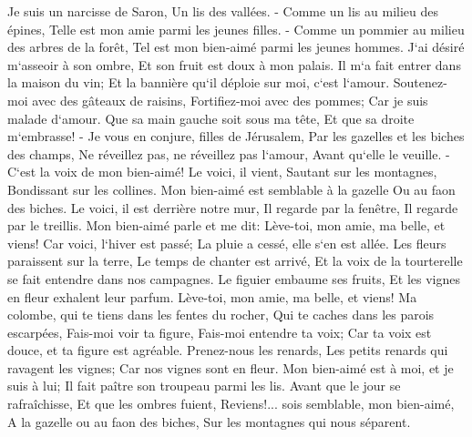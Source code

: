 \verse Je suis un narcisse de Saron, Un lis des vallées. - 
\verse Comme un lis au milieu des épines, Telle est mon amie parmi les jeunes filles. - 
\verse Comme un pommier au milieu des arbres de la forêt, Tel est mon bien-aimé parmi les jeunes hommes. J`ai désiré m`asseoir à son ombre, Et son fruit est doux à mon palais. 
\verse Il m`a fait entrer dans la maison du vin; Et la bannière qu`il déploie sur moi, c`est l`amour. 
\verse Soutenez-moi avec des gâteaux de raisins, Fortifiez-moi avec des pommes; Car je suis malade d`amour. 
\verse Que sa main gauche soit sous ma tête, Et que sa droite m`embrasse! - 
\verse Je vous en conjure, filles de Jérusalem, Par les gazelles et les biches des champs, Ne réveillez pas, ne réveillez pas l`amour, Avant qu`elle le veuille. - 
\verse C`est la voix de mon bien-aimé! Le voici, il vient, Sautant sur les montagnes, Bondissant sur les collines. 
\verse Mon bien-aimé est semblable à la gazelle Ou au faon des biches. Le voici, il est derrière notre mur, Il regarde par la fenêtre, Il regarde par le treillis. 
\verse Mon bien-aimé parle et me dit: Lève-toi, mon amie, ma belle, et viens! 
\verse Car voici, l`hiver est passé; La pluie a cessé, elle s`en est allée. 
\verse Les fleurs paraissent sur la terre, Le temps de chanter est arrivé, Et la voix de la tourterelle se fait entendre dans nos campagnes. 
\verse Le figuier embaume ses fruits, Et les vignes en fleur exhalent leur parfum. Lève-toi, mon amie, ma belle, et viens! 
\verse Ma colombe, qui te tiens dans les fentes du rocher, Qui te caches dans les parois escarpées, Fais-moi voir ta figure, Fais-moi entendre ta voix; Car ta voix est douce, et ta figure est agréable. 
\verse Prenez-nous les renards, Les petits renards qui ravagent les vignes; Car nos vignes sont en fleur. 
\verse Mon bien-aimé est à moi, et je suis à lui; Il fait paître son troupeau parmi les lis. 
\verse Avant que le jour se rafraîchisse, Et que les ombres fuient, Reviens!... sois semblable, mon bien-aimé, A la gazelle ou au faon des biches, Sur les montagnes qui nous séparent. 

\chapter{}

